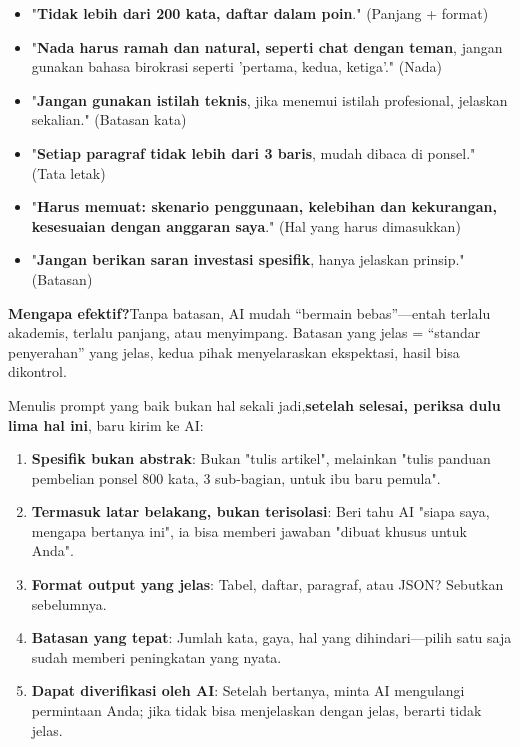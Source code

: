 
\begin{itemize}
  \item "\textbf{Tidak lebih dari 200 kata, daftar dalam poin}." (Panjang + format)
  \item "\textbf{Nada harus ramah dan natural, seperti chat dengan teman}, jangan gunakan bahasa birokrasi seperti 'pertama, kedua, ketiga'." (Nada)
  \item "\textbf{Jangan gunakan istilah teknis}, jika menemui istilah profesional, jelaskan sekalian." (Batasan kata)
  \item "\textbf{Setiap paragraf tidak lebih dari 3 baris}, mudah dibaca di ponsel." (Tata letak)
  \item "\textbf{Harus memuat: skenario penggunaan, kelebihan dan kekurangan, kesesuaian dengan anggaran saya}." (Hal yang harus dimasukkan)
  \item "\textbf{Jangan berikan saran investasi spesifik}, hanya jelaskan prinsip." (Batasan)
\end{itemize}

\textbf{Mengapa efektif?}Tanpa batasan, AI mudah “bermain bebas”—entah terlalu akademis, terlalu panjang, atau menyimpang. Batasan yang jelas = “standar penyerahan” yang jelas, kedua pihak menyelaraskan ekspektasi, hasil bisa dikontrol.


Menulis prompt yang baik bukan hal sekali jadi,\textbf{setelah selesai, periksa dulu lima hal ini}, baru kirim ke AI:

\begin{enumerate}
  \item \textbf{Spesifik bukan abstrak}: Bukan "tulis artikel", melainkan "tulis panduan pembelian ponsel 800 kata, 3 sub-bagian, untuk ibu baru pemula".
  \item \textbf{Termasuk latar belakang, bukan terisolasi}: Beri tahu AI "siapa saya, mengapa bertanya ini", ia bisa memberi jawaban "dibuat khusus untuk Anda".
  \item \textbf{Format output yang jelas}: Tabel, daftar, paragraf, atau JSON? Sebutkan sebelumnya.
  \item \textbf{Batasan yang tepat}: Jumlah kata, gaya, hal yang dihindari—pilih satu saja sudah memberi peningkatan yang nyata.
  \item \textbf{Dapat diverifikasi oleh AI}: Setelah bertanya, minta AI mengulangi permintaan Anda; jika tidak bisa menjelaskan dengan jelas, berarti tidak jelas.
\end{enumerate}

